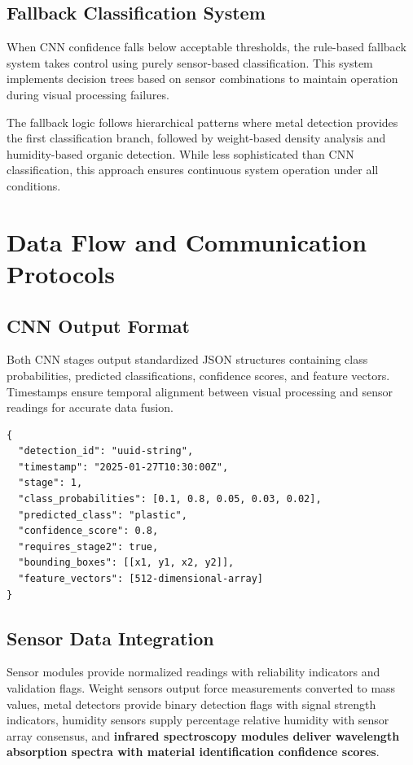 \documentclass[11pt, a4paper]{article}
\begin{document}
\subsection{Fallback Classification System}
When CNN confidence falls below acceptable thresholds, the rule-based fallback system takes control using purely sensor-based classification. This system implements decision trees based on sensor combinations to maintain operation during visual processing failures.

The fallback logic follows hierarchical patterns where metal detection provides the first classification branch, followed by weight-based density analysis and humidity-based organic detection. While less sophisticated than CNN classification, this approach ensures continuous system operation under all conditions.

\section{Data Flow and Communication Protocols}

\subsection{CNN Output Format}
Both CNN stages output standardized JSON structures containing class probabilities, predicted classifications, confidence scores, and feature vectors. Timestamps ensure temporal alignment between visual processing and sensor readings for accurate data fusion.

\begin{lstlisting}[style=jsonstyle, caption=Example CNN Output JSON]
{
  "detection_id": "uuid-string",
  "timestamp": "2025-01-27T10:30:00Z",
  "stage": 1,
  "class_probabilities": [0.1, 0.8, 0.05, 0.03, 0.02],
  "predicted_class": "plastic",
  "confidence_score": 0.8,
  "requires_stage2": true,
  "bounding_boxes": [[x1, y1, x2, y2]],
  "feature_vectors": [512-dimensional-array]
}
\end{lstlisting}

\subsection{Sensor Data Integration}
Sensor modules provide normalized readings with reliability indicators and validation flags. Weight sensors output force measurements converted to mass values, metal detectors provide binary detection flags with signal strength indicators, humidity sensors supply percentage relative humidity with sensor array consensus, and \textbf{infrared spectroscopy modules deliver wavelength absorption spectra with material identification confidence scores}.
\end{document}
